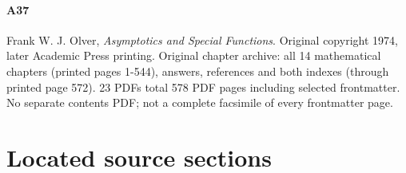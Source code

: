 \documentclass[11pt,oneside,a4paper]{book}
\theoremstyle{definition}
\theoremstyle{remark}
\begin{document}
\paragraph{A37} Frank W. J. Olver, \emph{Asymptotics and Special Functions}. Original copyright 1974, later Academic Press printing. Original chapter archive: all 14 mathematical chapters (printed pages 1-544), answers, references and both indexes (through printed page 572). 23 PDFs total 578 PDF pages including selected frontmatter. No separate contents PDF; not a complete facsimile of every frontmatter page.

\section*{Located source sections}

\small
\end{document}

